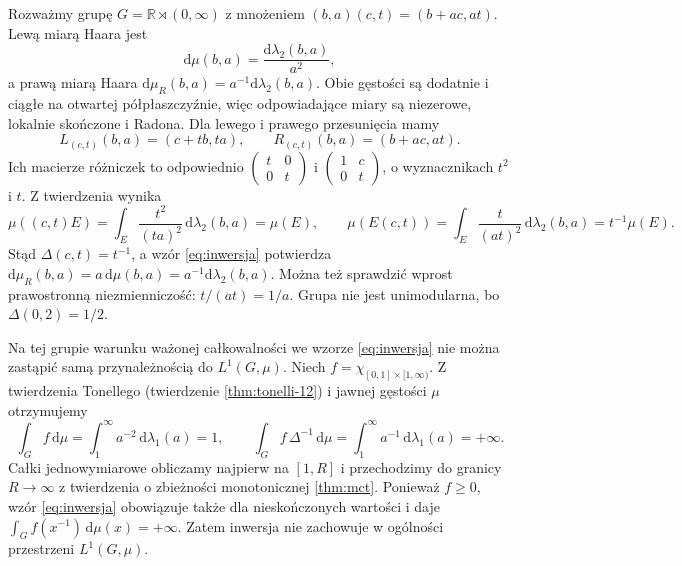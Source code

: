 \begin{przyklad}
\label{ex:haar-affine-23}
Rozważmy grupę $G=\mathbb R\rtimes(0,\infty)$
z mnożeniem
$(b,a)(c,t)=(b+ac,at)$. Lewą miarą Haara jest
\[
 \mathrm d\mu(b,a)=\frac{\mathrm d\lambda_2(b,a)}{a^2},
\]
a prawą miarą Haara
$\mathrm d\mu_R(b,a)=a^{-1}\mathrm d\lambda_2(b,a)$.
Obie gęstości są dodatnie i ciągłe na otwartej
półpłaszczyźnie, więc odpowiadające miary są
niezerowe, lokalnie skończone i Radona.
Dla lewego i prawego przesunięcia mamy
\[
 L_{(c,t)}(b,a)=(c+tb,ta),\qquad
 R_{(c,t)}(b,a)=(b+ac,at).
\]
Ich macierze różniczek to odpowiednio
$\begin{pmatrix}t&0\\0&t\end{pmatrix}$
i $\begin{pmatrix}1&c\\0&t\end{pmatrix}$,
o wyznacznikach $t^2$ i $t$.
Z twierdzenia 
wynika
\[
 \mu((c,t)E)=\int_E\frac{t^2}{(ta)^2}
       \,\mathrm d\lambda_2(b,a)=\mu(E),
 \qquad
 \mu(E(c,t))=\int_E\frac{t}{(at)^2}
       \,\mathrm d\lambda_2(b,a)=t^{-1}\mu(E).
\]
Stąd $\Delta(c,t)=t^{-1}$, a wzór
\eqref{eq:inwersja} potwierdza
$\mathrm d\mu_R(b,a)=a\,\mathrm d\mu(b,a)
=a^{-1}\mathrm d\lambda_2(b,a)$.
Można też sprawdzić wprost prawostronną
niezmienniczość: $t/(at)=1/a$.
Grupa nie jest unimodularna, bo $\Delta(0,2)=1/2$.

Na tej grupie warunku ważonej całkowalności
we wzorze \eqref{eq:inwersja} nie można zastąpić
samą przynależnością do $L^1(G,\mu)$. Niech
$f=\chi_{[0,1]\times[1,\infty)}$.
Z twierdzenia Tonellego (twierdzenie \ref{thm:tonelli-12})
i jawnej gęstości $\mu$ otrzymujemy
\[
 \int_G f\,\mathrm d\mu
 =\int_1^\infty a^{-2}\,\mathrm d\lambda_1(a)=1,
 \qquad
 \int_G f\,\Delta^{-1}\,\mathrm d\mu
 =\int_1^\infty a^{-1}\,\mathrm d\lambda_1(a)=+\infty.
\]
Całki jednowymiarowe obliczamy najpierw na $[1,R]$
i przechodzimy do granicy $R\to\infty$ z twierdzenia
o zbieżności monotonicznej \ref{thm:mct}.
Ponieważ $f\ge0$, wzór \eqref{eq:inwersja} obowiązuje
także dla nieskończonych wartości i daje
$\int_G f(x^{-1})\,\mathrm d\mu(x)=+\infty$.
Zatem inwersja nie zachowuje w ogólności przestrzeni
$L^1(G,\mu)$.
\end{przyklad}



